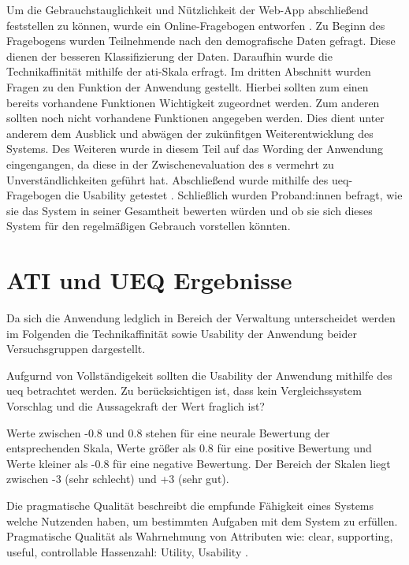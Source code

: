 Um die Gebrauchstauglichkeit und Nützlichkeit der Web-App abschließend feststellen zu können, wurde
ein Online-Fragebogen entworfen . Zu Beginn des Fragebogens wurden
Teilnehmende nach den demografische Daten gefragt. Diese dienen der besseren Klassifizierung der
Daten. Daraufhin wurde die Technikaffinität mithilfe der \ac{ati}-Skala erfragt. Im dritten
Abschnitt wurden Fragen zu den Funktion der Anwendung gestellt. Hierbei sollten zum einen bereits
vorhandene Funktionen Wichtigkeit zugeordnet werden. Zum anderen sollten noch nicht vorhandene
Funktionen angegeben werden. Dies dient unter anderem dem Ausblick und abwägen der zukünfitgen
Weiterentwicklung des Systems. Des Weiteren wurde in diesem Teil auf das Wording der Anwendung
eingengangen, da diese in der Zwischenevaluation des s vermehrt zu
Unverständlichkeiten geführt hat. Abschließend wurde mithilfe des \ac{ueq}-Fragebogen die Usability
getestet \cite{burghardt_mensch_2018}. Schließlich wurden Proband:innen befragt, wie sie das System
in seiner Gesamtheit bewerten würden und ob sie sich dieses System für den regelmäßigen Gebrauch
vorstellen könnten.



\section{ATI und UEQ Ergebnisse}
Da sich die Anwendung ledglich in Bereich der Verwaltung unterscheidet werden im Folgenden die
Technikaffinität sowie Usability der Anwendung beider Versuchsgruppen dargestellt.

Aufgurnd von Vollständigekeit sollten die Usability der Anwendung mithilfe des \ac{ueq} betrachtet
werden. Zu berücksichtigen ist, dass kein Vergleichssystem Vorschlag und die Aussagekraft der Wert
fraglich ist?

Werte zwischen -0.8 und 0.8 stehen für eine neurale Bewertung der entsprechenden Skala, Werte größer
als 0.8 für eine positive Bewertung und Werte kleiner als -0.8 für eine negative Bewertung. Der
Bereich der Skalen liegt zwischen -3 (sehr schlecht) und +3 (sehr gut). 


Die pragmatische Qualität beschreibt die empfunde Fähigkeit eines Systems welche Nutzenden haben, um
bestimmten Aufgaben mit dem System zu erfüllen. Pragmatische Qualität als Wahrnehmung von Attributen
wie: clear, supporting, useful, controllable Hassenzahl: Utility, Usability
\cite{hassenzahl_thing_2004}.

